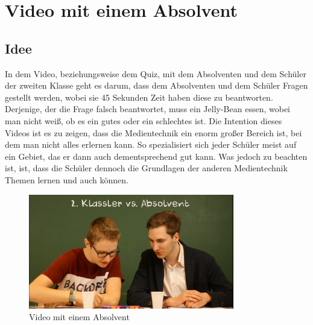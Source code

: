 \section{Video mit einem Absolvent}
\subsection{Idee}
In dem Video, beziehungsweise dem Quiz, mit dem Absolventen und dem Schüler der zweiten Klasse geht es darum, dass dem Absolventen und dem Schüler Fragen gestellt werden, wobei sie 45 Sekunden Zeit haben diese zu beantworten. Derjenige, der die Frage falsch beantwortet, muss ein Jelly-Bean essen, wobei man nicht weiß, ob es ein gutes oder ein schlechtes ist. Die Intention dieses Videos ist es zu zeigen, dass die Medientechnik ein enorm großer Bereich ist, bei dem man nicht alles erlernen kann. So spezialisiert sich jeder Schüler meist auf ein Gebiet, das er dann auch dementsprechend gut kann. Was jedoch zu beachten ist, ist, dass die Schüler dennoch die Grundlagen der anderen Medientechnik Themen lernen und auch können.
\begin{figure}[H]
	\centering	
	\includegraphics[width=0.8\textwidth]{abb25} 
	\caption{Video mit einem Absolvent}
\end{figure}